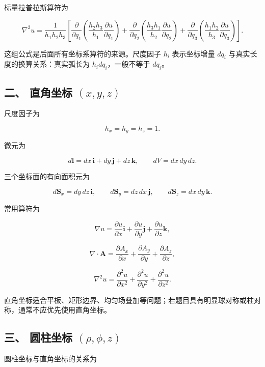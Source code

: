 标量拉普拉斯算符为

\[
\nabla^2u
=
\frac{1}{h_1h_2h_3}
\left[
\frac{\partial}{\partial q_1}
\left(
\frac{h_2h_3}{h_1}\frac{\partial u}{\partial q_1}
\right)
+
\frac{\partial}{\partial q_2}
\left(
\frac{h_3h_1}{h_2}\frac{\partial u}{\partial q_2}
\right)
+
\frac{\partial}{\partial q_3}
\left(
\frac{h_1h_2}{h_3}\frac{\partial u}{\partial q_3}
\right)
\right].
\]

这组公式是后面所有坐标系算符的来源。尺度因子 \(h_i\) 表示坐标增量
\(dq_i\) 与真实长度的换算关系：真实弧长为 \(h_i dq_i\)，一般不等于
\(dq_i\)。

\subsection{\texorpdfstring{二、 直角坐标
\((x,y,z)\)}{二、 直角坐标 (x,y,z)}}\label{m1:ux4e8c-ux76f4ux89d2ux5750ux6807-xyz}

尺度因子为

\[
h_x=h_y=h_z=1.
\]

微元为

\[
d\mathbf{l}=dx\,\mathbf{i}+dy\,\mathbf{j}+dz\,\mathbf{k},
\qquad
dV=dx\,dy\,dz.
\]

三个坐标面的有向面积元为

\[
d\mathbf{S}_x=dy\,dz\,\mathbf{i},
\qquad
d\mathbf{S}_y=dz\,dx\,\mathbf{j},
\qquad
d\mathbf{S}_z=dx\,dy\,\mathbf{k}.
\]

常用算符为

\[
\nabla u
=
\frac{\partial u}{\partial x}\mathbf{i}
+
\frac{\partial u}{\partial y}\mathbf{j}
+
\frac{\partial u}{\partial z}\mathbf{k},
\]

\[
\nabla\cdot\mathbf{A}
=
\frac{\partial A_x}{\partial x}
+
\frac{\partial A_y}{\partial y}
+
\frac{\partial A_z}{\partial z},
\]

\[
\nabla^2u
=
\frac{\partial^2u}{\partial x^2}
+
\frac{\partial^2u}{\partial y^2}
+
\frac{\partial^2u}{\partial z^2}.
\]

直角坐标适合平板、矩形边界、均匀场叠加等问题；若题目具有明显球对称或柱对称，通常不应优先使用直角坐标。

\subsection{\texorpdfstring{三、 圆柱坐标
\((\rho,\phi,z)\)}{三、 圆柱坐标 (\textbackslash rho,\textbackslash phi,z)}}\label{m1:ux4e09-ux5706ux67f1ux5750ux6807-rhophiz}

圆柱坐标与直角坐标的关系为

